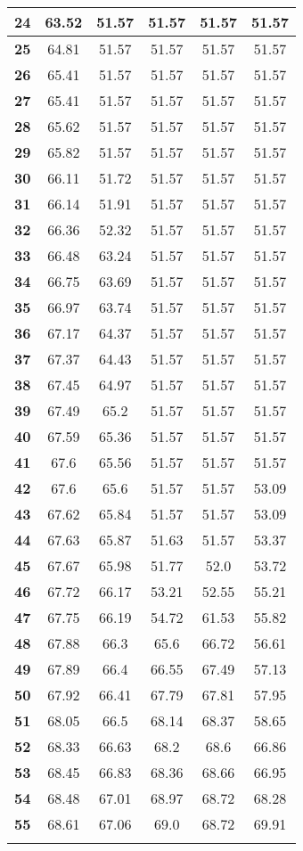 \begin{longtable}{|c|c|c|c|c|c|}
\textbf{24} & 63.52 & 51.57 & 51.57 & 51.57 & 51.57 \\ \hline 
\textbf{25} & 64.81 & 51.57 & 51.57 & 51.57 & 51.57 \\ \hline 
\textbf{26} & 65.41 & 51.57 & 51.57 & 51.57 & 51.57 \\ \hline 
\textbf{27} & 65.41 & 51.57 & 51.57 & 51.57 & 51.57 \\ \hline 
\textbf{28} & 65.62 & 51.57 & 51.57 & 51.57 & 51.57 \\ \hline 
\textbf{29} & 65.82 & 51.57 & 51.57 & 51.57 & 51.57 \\ \hline 
\textbf{30} & 66.11 & 51.72 & 51.57 & 51.57 & 51.57 \\ \hline 
\textbf{31} & 66.14 & 51.91 & 51.57 & 51.57 & 51.57 \\ \hline 
\textbf{32} & 66.36 & 52.32 & 51.57 & 51.57 & 51.57 \\ \hline 
\textbf{33} & 66.48 & 63.24 & 51.57 & 51.57 & 51.57 \\ \hline 
\textbf{34} & 66.75 & 63.69 & 51.57 & 51.57 & 51.57 \\ \hline 
\textbf{35} & 66.97 & 63.74 & 51.57 & 51.57 & 51.57 \\ \hline 
\textbf{36} & 67.17 & 64.37 & 51.57 & 51.57 & 51.57 \\ \hline 
\textbf{37} & 67.37 & 64.43 & 51.57 & 51.57 & 51.57 \\ \hline 
\textbf{38} & 67.45 & 64.97 & 51.57 & 51.57 & 51.57 \\ \hline 
\textbf{39} & 67.49 & 65.2 & 51.57 & 51.57 & 51.57 \\ \hline 
\textbf{40} & 67.59 & 65.36 & 51.57 & 51.57 & 51.57 \\ \hline 
\textbf{41} & 67.6 & 65.56 & 51.57 & 51.57 & 51.57 \\ \hline 
\textbf{42} & 67.6 & 65.6 & 51.57 & 51.57 & 53.09 \\ \hline 
\textbf{43} & 67.62 & 65.84 & 51.57 & 51.57 & 53.09 \\ \hline 
\textbf{44} & 67.63 & 65.87 & 51.63 & 51.57 & 53.37 \\ \hline 
\textbf{45} & 67.67 & 65.98 & 51.77 & 52.0 & 53.72 \\ \hline 
\textbf{46} & 67.72 & 66.17 & 53.21 & 52.55 & 55.21 \\ \hline 
\textbf{47} & 67.75 & 66.19 & 54.72 & 61.53 & 55.82 \\ \hline 
\textbf{48} & 67.88 & 66.3 & 65.6 & 66.72 & 56.61 \\ \hline 
\textbf{49} & 67.89 & 66.4 & 66.55 & 67.49 & 57.13 \\ \hline 
\textbf{50} & 67.92 & 66.41 & 67.79 & 67.81 & 57.95 \\ \hline 
\textbf{51} & 68.05 & 66.5 & 68.14 & 68.37 & 58.65 \\ \hline 
\textbf{52} & 68.33 & 66.63 & 68.2 & 68.6 & 66.86 \\ \hline 
\textbf{53} & 68.45 & 66.83 & 68.36 & 68.66 & 66.95 \\ \hline 
\textbf{54} & 68.48 & 67.01 & 68.97 & 68.72 & 68.28 \\ \hline 
\textbf{55} & 68.61 & 67.06 & 69.0 & 68.72 & 69.91 \\ \hline 

    \caption[]{}
    \label{Tab:}
\end{longtable}